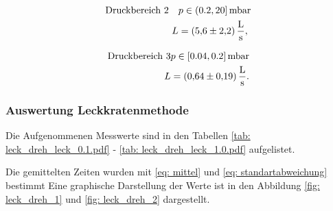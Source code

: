 \begin{align}
  \label{eq:dreh_leit_2}
  \begin{aligned}
  \text{Druckbereich 2} \quad  &p\in(0.2,20]\,\si{\milli\bar} \\
   L&=\SI{5.6\pm 2.2}{\litre\per\second},
\end{aligned}
\end{align}

\begin{align}
  \label{eq:dreh_leit_3}
  \begin{aligned}
  \text{Druckbereich 3} &p\in[0.04,0.2]\,\si{\milli\bar} \\
   L&=\SI{0.64\pm 0.19}{\litre\per\second}.
\end{aligned}
\end{align}

\subsubsection{Auswertung Leckkratenmethode}

Die Aufgenommenen Messwerte sind in den Tabellen \ref{tab: leck_dreh_leck_0.1.pdf} - \ref{tab: leck_dreh_leck_1.0.pdf} aufgelistet.





Die gemittelten Zeiten wurden mit \eqref{eq: mittel} und \eqref{eq: standartabweichung} bestimmt
Eine graphische Darstellung der Werte ist in den Abbildung \ref{fig: leck_dreh_1} und \ref{fig: leck_dreh_2} dargestellt.

